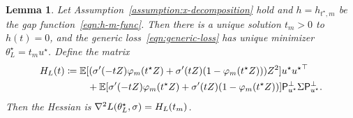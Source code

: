\documentclass[11pt]{article}
\newcommand{\E}{\mathbb{E}}
\newcommand{\proj}{\mathsf{P}}
\newcommand{\projperp}{\proj_{u\opt}^\perp}
\newcommand{\<}{\langle} %
\renewcommand{\>}{\rangle}
\newcommand{\defeq}{\coloneqq}
\newcommand{\opt}{^\star}
\newtheorem{lemma}[claim]{Lemma}
\begin{document}
\begin{lemma}
  \label{lemma:generic-solutions}
  Let Assumption~\ref{assumption:x-decomposition} hold and $h = h_{t\opt,m}$
  be the gap function~\eqref{eqn:h-m-func}. Then there is a unique solution
  $t_m > 0$ to $h(t) = 0$, and the generic loss~\eqref{eqn:generic-loss} has
  unique minimizer $\theta\opt_L = t_m u\opt$.  Define the matrix
  \begin{equation}
    \begin{split}
      \Hessian(t) &
      \defeq \E[(\sigma'(-tZ) \varphi_m(t\opt Z) + \sigma'(tZ)
	(1 - \varphi_m(t\opt Z))) Z^2 ] u\opt {u\opt}^\top \\
      & \qquad
      ~ + \E[\sigma'(-tZ) \varphi_m(t\opt Z)
	+ \sigma'(tZ) (1 - \varphi_m(t\opt Z))]
      \projperp \Sigma \projperp.
    \end{split}
    \label{eqn:parameterized-hessian}
  \end{equation}
  Then the Hessian is $\nabla^2 L(\theta\opt_L, \sigma) = \Hessian(t_m)$.
\end{lemma}
\end{document}
